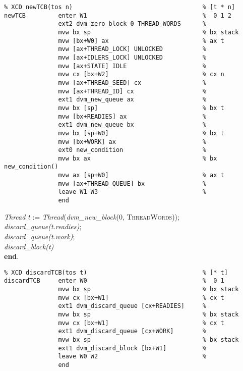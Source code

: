 {\small
\begin{verbatim}
% XCD newTCB(tos n)                                    % [t * n]
newTCB         enter W1                                %  0 1 2
               ext2 dvm_zero_block 0 THREAD_WORDS      %
               mvw bx sp                               % bx stack
               mvw [bx+W0] ax                          % ax t 
               mvw [ax+THREAD_LOCK] UNLOCKED           %
               mvw [ax+IDLERS_LOCK] UNLOCKED           %
               mvw [ax+STATE] IDLE                     %
               mvw cx [bx+W2]                          % cx n
               mvw [ax+THREAD_SEED] cx                 %
               mvw [ax+THREAD_ID] cx                   %
               ext1 dvm_new_queue ax                   %
               mvw bx [sp]                             % bx t
               mvw [bx+READIES] ax                     %
               ext1 dvm_new_queue bx                   %
               mvw bx [sp+W0]                          % bx t
               mvw [bx+WORK] ax                        %
               ext0 new_condition                      %
               mvw bx ax                               % bx new_condition()
               mvw ax [sp+W0]                          % ax t
               mvw [ax+THREAD_QUEUE] bx                %
               leave W1 W3                             %
               end
\end{verbatim}}

\begin{tabbing}
\indents
{}
\vb\>\>\emph{Thread} \emph{t} := \emph{Thread}(\emph{dvm\_new\_block}(0, \textsc{ThreadWords})); \\
\vb\>\>\emph{discard\_queue(t.readies)};\\
\vb\>\>\emph{discard\_queue(t.work)};\\
\vb\>\>\emph{discard\_block(t)}\\
\vb\>\textbf{end}.
\end{tabbing}

{\small
\begin{verbatim}
% XCD discardTCB(tos t)                                % [* t]
discardTCB     enter W0                                %  0 1
               mvw bx sp                               % bx stack
               mvw cx [bx+W1]                          % cx t
               ext1 dvm_discard_queue [cx+READIES]     %
               mvw bx sp                               % bx stack
               mvw cx [bx+W1]                          % cx t
               ext1 dvm_discard_queue [cx+WORK]        %
               mvw bx sp                               % bx stack
               ext1 dvm_discard_block [bx+W1]          %
               leave W0 W2                             %
               end
\end{verbatim}}

